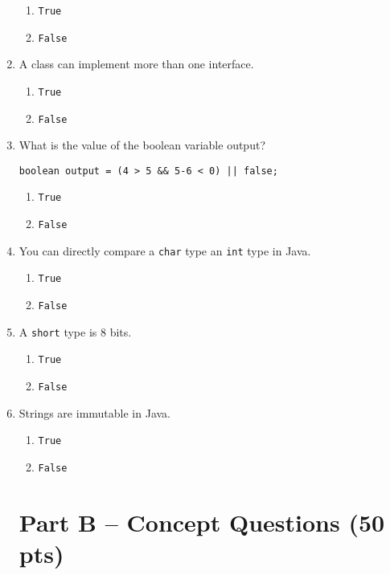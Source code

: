 \documentclass[S17-Final.tex]{subfiles}
\begin{document}
\begin{enumerate}
\begin{enumerate}
\item  \texttt{True}
\item  \texttt{False}
\end{enumerate}

\item A class can implement more than one interface.

\begin{enumerate}
\item  \texttt{True} 
\item  \texttt{False}  
\end{enumerate}
\clearpage
\item What is the value of the boolean variable output?
\begin{lstlisting}
boolean output = (4 > 5 && 5-6 < 0) || false;
\end{lstlisting}

\begin{enumerate}
\item  \texttt{True}
\item  \texttt{False}  
\end{enumerate}

\item You can directly compare a \texttt{char} type an \texttt{int} type in Java.

\begin{enumerate}
\item  \texttt{True} 
\item  \texttt{False}  
\end{enumerate}

\item A \texttt{short} type is 8 bits.

\begin{enumerate}
\item  \texttt{True}
\item  \texttt{False} 
\end{enumerate}

\item Strings are immutable in Java.

\begin{enumerate}
\item  \texttt{True} 
\item  \texttt{False}  
\end{enumerate}

\clearpage
\section*{Part B -- Concept Questions (50 pts)}


\end{enumerate}
\end{document}
